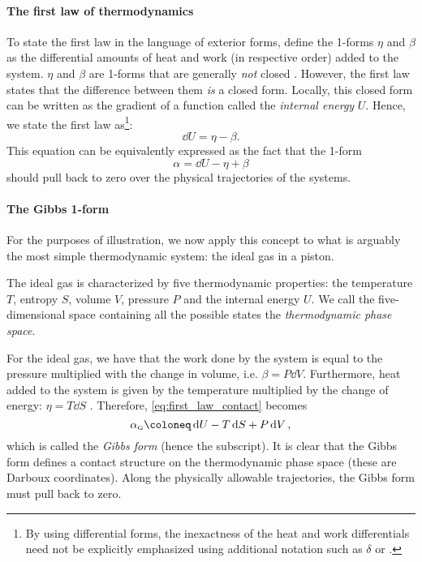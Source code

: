 \paragraph{The first law of thermodynamics} To state the first law in the language of exterior forms, define the 1-forms \(\eta\) and \(\beta\) as the differential amounts of heat and work (in respective order) added to the system. \(\eta\) and \(\beta\) are 1-forms that are generally \emph{not} closed \cite{Bamberg1988,Frankel2012}. However, the first law states that the difference between them \emph{is} a closed form. Locally, this closed form  can be written as the gradient of a function called the \emph{internal energy} \(U\). Hence, we state the first law as\footnote{By using differential forms, the inexactness of the heat and work differentials need not be explicitly emphasized using additional notation such as \(\delta\) or \dj.}:
\begin{equation}
    \dd{U} = \eta - \beta.
    \label{eq:thermo_first_law}
\end{equation}
This equation can be equivalently expressed as the fact that the 1-form
\begin{equation}
    \alpha = \dd{U} - \eta + \beta
    \label{eq:first_law_contact}
\end{equation}
should pull back to zero over the physical trajectories of the systems.

\paragraph{The Gibbs 1-form} For the purposes of illustration, we now apply this concept to what is arguably the most simple thermodynamic system: the ideal gas in a piston. 

The ideal gas is characterized by five thermodynamic properties: the temperature \(T\), entropy \(S\), volume \(V\), pressure \(P\) and the internal energy \(U\). We call the five-dimensional space containing all the possible states the \emph{thermodynamic phase space}.

For the ideal gas, we have that the work done by the system is equal to the pressure multiplied with the change in volume, i.e. \(\beta = P\dd{V}\). Furthermore, heat added to the system is given by the temperature multiplied by the change of energy: \(\eta = T\dd{S}\) \cite{Arnold1989b,Wightman1979,Bamberg1988}. Therefore, \cref{eq:first_law_contact} becomes
\begin{equation}
    \alpha_\text{\tiny G} \coloneq \dd{U} - T\dd{S} + P\dd{V},
    \label{eq:gibbs_form}
\end{equation}
which is called the \emph{Gibbs form} (hence the subscript). It is clear that the Gibbs form defines a contact structure on the thermodynamic phase space (these are Darboux coordinates). Along the physically allowable trajectories, the Gibbs form must pull back to zero.

